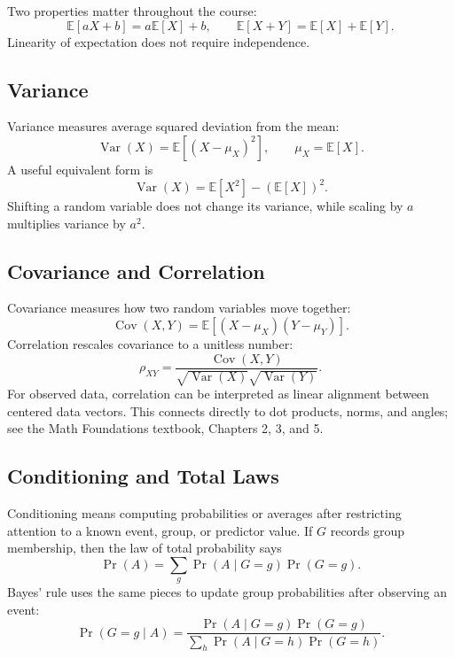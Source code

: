 {Two properties matter throughout the course:
\begin{equation}
  \mathbb{E}[aX+b]=a\mathbb{E}[X]+b,
  \qquad
  \mathbb{E}[X+Y]=\mathbb{E}[X]+\mathbb{E}[Y].
\end{equation}
Linearity of expectation does not require independence.

\subsection{Variance}

Variance measures average squared deviation from the mean:
\begin{equation}
  \operatorname{Var}(X)=\mathbb{E}\left[(X-\mu_X)^2\right],
  \qquad \mu_X=\mathbb{E}[X].
\end{equation}
A useful equivalent form is
\begin{equation}
  \operatorname{Var}(X)=\mathbb{E}[X^2]-\left(\mathbb{E}[X]\right)^2.
\end{equation}
Shifting a random variable does not change its variance, while scaling by $a$ multiplies variance by $a^2$.

\subsection{Covariance and Correlation}

Covariance measures how two random variables move together:
\begin{equation}
  \operatorname{Cov}(X,Y)=\mathbb{E}\left[(X-\mu_X)(Y-\mu_Y)\right].
\end{equation}
Correlation rescales covariance to a unitless number:
\begin{equation}
  \rho_{XY}=\frac{\operatorname{Cov}(X,Y)}{\sqrt{\operatorname{Var}(X)}\sqrt{\operatorname{Var}(Y)}}.
\end{equation}
For observed data, correlation can be interpreted as linear alignment between centered data vectors.  This connects directly to dot products, norms, and angles; see the Math Foundations textbook, Chapters 2, 3, and 5.

\subsection{Conditioning and Total Laws}

Conditioning means computing probabilities or averages after restricting attention to a known event, group, or predictor value.  If \(G\) records group membership, then the law of total probability says
\[
  \Pr(A)=\sum_g \Pr(A\mid G=g)\Pr(G=g).
\]
Bayes' rule uses the same pieces to update group probabilities after observing an event:
\[
  \Pr(G=g\mid A)
  =
  \frac{\Pr(A\mid G=g)\Pr(G=g)}
       {\sum_h \Pr(A\mid G=h)\Pr(G=h)}.
\]

}
